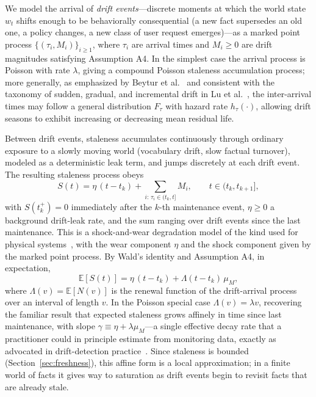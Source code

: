 \documentclass[electronics,article,submit,pdftex,moreauthors]{Definitions/mdpi}
\newcommand{\E}{\mathbb{E}}
\newcommand{\tkp}{t_k^{+}}
\begin{document}
We model the arrival of \textit{drift events}---discrete moments at which the world state $w_t$ shifts enough to be behaviorally consequential (a new fact supersedes an old one, a policy changes, a new class of user request emerges)---as a marked point process $\{(\tau_i,M_i)\}_{i\ge 1}$, where $\tau_i$ are arrival times and $M_i\ge 0$ are drift magnitudes satisfying Assumption A4. In the simplest case the arrival process is Poisson with rate $\lambda$, giving a compound Poisson staleness accumulation process; more generally, as emphasized by Beytur et al.~\cite{Beytur2025} and consistent with the taxonomy of sudden, gradual, and incremental drift in Lu et al.~\cite{Lu2019}, the inter-arrival times may follow a general distribution $F_\tau$ with hazard rate $h_\tau(\cdot)$, allowing drift seasons to exhibit increasing or decreasing mean residual life.

Between drift events, staleness accumulates continuously through ordinary exposure to a slowly moving world (vocabulary drift, slow factual turnover), modeled as a deterministic leak term, and jumps discretely at each drift event. The resulting staleness process obeys
\begin{equation}\label{eq:shockwear}
S(t)=\eta\,(t-t_k)+\sum_{i:\,\tau_i\in(t_k,t]}M_i,\qquad t\in(t_k,t_{k+1}],
\end{equation}
with $S(\tkp)=0$ immediately after the $k$-th maintenance event, $\eta\ge 0$ a background drift-leak rate, and the sum ranging over drift events since the last maintenance. This is a shock-and-wear degradation model of the kind used for physical systems~\cite{vanNoortwijk2009}, with the wear component $\eta$ and the shock component given by the marked point process. By Wald's identity and Assumption A4, in expectation,
\begin{equation}\label{eq:meanstaleness}
\E[S(t)]=\eta\,(t-t_k)+\Lambda(t-t_k)\,\mu_M,
\end{equation}
where $\Lambda(v)=\E[N(v)]$ is the renewal function of the drift-arrival process over an interval of length $v$. In the Poisson special case $\Lambda(v)=\lambda v$, recovering the familiar result that expected staleness grows affinely in time since last maintenance, with slope $\gamma\equiv\eta+\lambda\mu_M$---a single effective decay rate that a practitioner could in principle estimate from monitoring data, exactly as advocated in drift-detection practice~\cite{Lu2019}. Since staleness is bounded (Section~\ref{sec:freshness}), this affine form is a local approximation; in a finite world of facts it gives way to saturation as drift events begin to revisit facts that are already stale.
\end{document}
